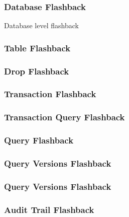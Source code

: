 \subsubsection{Database Flashback}
Database level flashback



\subsubsection{Table Flashback}

\subsubsection{Drop Flashback}

\subsubsection{Transaction Flashback}

\subsubsection{Transaction Query Flashback}

\subsubsection{Query Flashback}

\subsubsection{Query Versions Flashback}

\subsubsection{Query Versions Flashback}

\subsubsection{Audit Trail Flashback}


